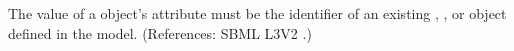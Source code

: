 The value of a \RateRule object's  attribute must be the
identifier of an existing \Species, \Compartment, \Parameter or
\SpeciesReference object defined in the model.  (References: SBML L3V2
.)
